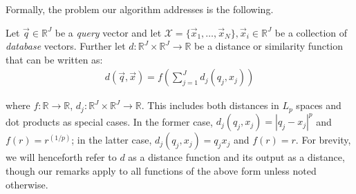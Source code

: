 \begin{table*}[t]
\begin{tabularx}{\linewidth}{X|YYYY}
\bottomrule
\end{tabularx}
\end{table*}

Formally, the problem our algorithm addresses is the following.

Let $\vec{q} \in \mathbb{R}^J$ be a \textit{query} vector and let $\mathcal{X} = \{\vec{x}_1,\ldots,\vec{x}_N\}, \vec{x}_i \in \mathbb{R}^J$ be a collection of \textit{database} vectors. Further let $d: \mathbb{R}^J \times \mathbb{R}^J \rightarrow \mathbb{R}$ be a distance or similarity function that can be written as:
\begin{align} \label{eq:distFuncForm}
        d(\vec{q}, \vec{x}) = f(\sum_{j=1}^J d_j(q_j, x_j))
\end{align}


where $f: \mathbb{R} \rightarrow \mathbb{R}$, $d_j: \mathbb{R}^J \times \mathbb{R}^J \rightarrow \mathbb{R}$. This includes both distances in $L_p$ spaces and dot products as special cases. In the former case, $d_j(q_j, x_j) = |q_j - x_j|^p$ and $f(r) = r^{(1/p)}$; in the latter case, $d_j(q_j, x_j) = q_j x_j$ and $f(r) = r$. For brevity, we will henceforth refer to $d$ as a distance function and its output as a distance, though our remarks apply to all functions of the above form unless noted otherwise.

